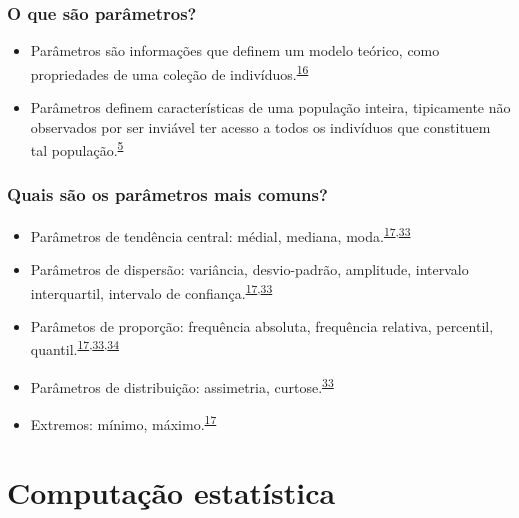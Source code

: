 \documentclass[
]{book}
\begin{document}
\hypertarget{o-que-suxe3o-paruxe2metros}{%
\subsection{O que são parâmetros?}\label{o-que-suxe3o-paruxe2metros}}

\begin{itemize}
\item
  Parâmetros são informações que definem um modelo teórico, como propriedades de uma coleção de indivíduos.\textsuperscript{\protect\hyperlink{ref-Altman1999}{16}}
\item
  Parâmetros definem características de uma população inteira, tipicamente não observados por ser inviável ter acesso a todos os indivíduos que constituem tal população.\textsuperscript{\protect\hyperlink{ref-vetter2017}{5}}
\end{itemize}

\hypertarget{quais-suxe3o-os-paruxe2metros-mais-comuns}{%
\subsection{Quais são os parâmetros mais comuns?}\label{quais-suxe3o-os-paruxe2metros-mais-comuns}}

\begin{itemize}
\item
  Parâmetros de tendência central: médial, mediana, moda.\textsuperscript{\protect\hyperlink{ref-Ali2016}{17},\protect\hyperlink{ref-kanji2006}{33}}
\item
  Parâmetros de dispersão: variância, desvio-padrão, amplitude, intervalo interquartil, intervalo de confiança.\textsuperscript{\protect\hyperlink{ref-Ali2016}{17},\protect\hyperlink{ref-kanji2006}{33}}
\item
  Parâmetos de proporção: frequência absoluta, frequência relativa, percentil, quantil.\textsuperscript{\protect\hyperlink{ref-Ali2016}{17},\protect\hyperlink{ref-kanji2006}{33},\protect\hyperlink{ref-Altman1994}{34}}
\item
  Parâmetros de distribuição: assimetria, curtose.\textsuperscript{\protect\hyperlink{ref-kanji2006}{33}}
\item
  Extremos: mínimo, máximo.\textsuperscript{\protect\hyperlink{ref-Ali2016}{17}}
\end{itemize}

\hypertarget{computacao-estatistica}{%
\chapter{\texorpdfstring{\textbf{Computação estatística}}{Computação estatística}}\label{computacao-estatistica}}
\end{document}
